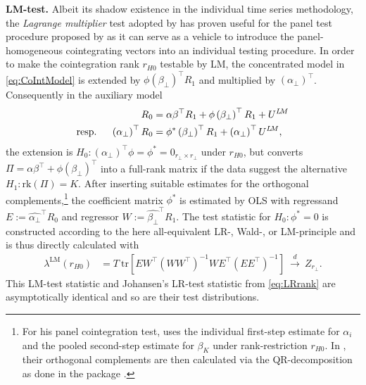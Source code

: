 \textbf{LM-test.} Albeit its shadow existence in the individual time series methodology, the \textit{Lagrange multiplier} test adopted by \cite{LuukkonenEtAl1999} has proven useful for the panel test procedure proposed by \cite{Breitung2005} as it can serve as a vehicle to introduce the panel-homogeneous cointegrating vectors into an individual testing procedure. In order to make the cointegration rank $ r_{H0} $ testable by LM, the concentrated model in \eqref{eq:CoIntModel} is extended by $ \phi \left( \beta_\perp \right)^\top R_{1} $ and multiplied by $ \left( \alpha_\perp \right)^\top $. Consequently in the auxiliary model
\begin{align} \label{eq:auxLMrank}
\begin{split}
	R_{0} & = \alpha \beta^\top R_{1} + \phi \left( \beta_\perp \right)^\top R_{1} + U^{{L \! M}} \\
	\text{resp. \quad} \left( \alpha_\perp \right)^\top R_{0} & = \phi^* \left( \beta_\perp \right)^\top R_{1} + \left( \alpha_\perp \right)^\top U^{{L \! M}},
\end{split}
\end{align}
the extension is $ H_0: \left( \alpha_\perp \right)^\top \phi = \phi^* = 0_{r_\perp \times r_\perp} $ under $ r_{H0} $, but converts $ \Pi = \alpha \beta^\top + \phi \left( \beta_\perp \right)^\top $ into a full-rank matrix if the data suggest the alternative $ H_1: \text{rk}(\Pi) = K $. After inserting suitable estimates for the orthogonal complements,\footnote{For his panel cointegration test, \citet{Breitung2005} uses the individual first-step estimate for $ \alpha_i $ and the pooled second-step estimate for $ \beta_K $ under rank-restriction $ r_{H0} $. In , their orthogonal complements are then calculated via the QR-decomposition as done in the  package \citep{VenablesRipley2002}.} the coefficient matrix $ \phi^* $ is estimated by OLS with regressand $ E := \widehat{\alpha_\perp}^\top R_0 $ and regressor $ W := \widehat{\beta_\perp}^\top R_1 $. The test statistic for $ H_0: \phi^* = 0 $ is constructed according to the here all-equivalent LR-, Wald-, or LM-principle and is thus directly calculated with
\begin{align} \label{eq:LMrank}
	\lambda^{\text{LM}} \left( r_{H0} \right) & = T \ \text{tr} \left[ EW^\top \left( WW^\top \right)^{-1} WE^\top \left( EE^\top \right)^{-1} \right] \ \overset{d}{\longrightarrow} \ Z_{r_\perp}.
\end{align}
This LM-test statistic and Johansen's LR-test statistic from \eqref{eq:LRrank} are asymptotically identical and so are their test distributions.


